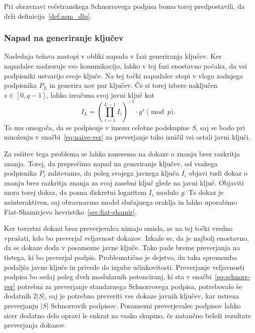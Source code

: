 \documentclass[isrm2, tisk]{fmfdelo}
\begin{document}
Pri obravnavi večstranskega Schnorrovega podpisa bomo torej predpostavili, da drži definicija~\ref{def:asm_dlp}.

\subsubsection{Napad na generiranje ključev}
Naslednja težava nastopi v obliki napada v fazi generiranja ključev. Ker napadalec nadzoruje vso
komunikacijo, lahko v tej fazi enostavno počaka, da vsi podpisniki ustvarijo svoje ključe. Na tej
točki napadalec stopi v vlogo zadnjega podpisnika $P_L$ in generira nov par ključev.
Če si torej izbere naključen $s \in [0, q- 1]$, lahko izračuna svoj javni ključ kot
$$
I_L = \left( \prod_{i=1}^{L-1} I_i \right)^{-1} \cdot g^s \pmod p.
$$
To mu omogoča, da se podpisuje v imenu celotne podskupine $S$, saj se bodo pri množenju v
enačbi~\eqref{eq:naive-ver} za preverjanje tako izničil vsi ostali javni ključi.

Za rešitev tega problema se lahko zanesemo na dokaze o znanju brez razkritja znanja.
Torej, da preprečimo napad na generiranje ključev, od vsakega podpisnika $P_i$ zahtevamo, da poleg
svojega javnega ključa $I_i$ objavi tudi dokaz o znanju brez razkritja znanja za svoj zasebni ključ
glede na javni ključ. Objaviti mora torej dokaz, da pozna diskretni logaritem $I_i$ modulo $g$.
Ta dokaz je neinteraktiven, saj obravnavmo model slučajnega oraklja in lahko uporabimo Fiat-Shamirjevo
hevristiko~\ref{sec:fiat-shamir}.

Ker tovrstni dokazi brez preverjevalca nimajo smisla, se na tej točki vredno vprašati, kdo bo preverjal
veljavnost dokazov. Izkaže se, da je najbolj enostavno, da se dokaze doda v posamezne javne ključe.
Tako pade breme preverjanja na tistega, ki bo preverjal podpis. Problematično je dejstvo, da taka
sprememba podaljša javne ključe in privede do izgube učinkovitosti. Preverjanje veljavnosti podpisa 
bo sedaj poleg dveh modularnih potenciranj, ki sta v enačbi~\eqref{eq:schnorr-ver} potrebni za
preverjanje standarnega Schnorrovega podpisa, potrebovalo še dodatnih $2|S|$, saj je potrebno
preveriti vse dokaze javnih ključev, kar ustreza preverjanju $|S|$ Schnorrovih podpisov. Posamezni
preverjevalec podpisov lahko sicer dodatno delo opravi le enkrat za vsako skupino, če natančno beleži
rezultate preverjanja dokazov.
\end{document}
